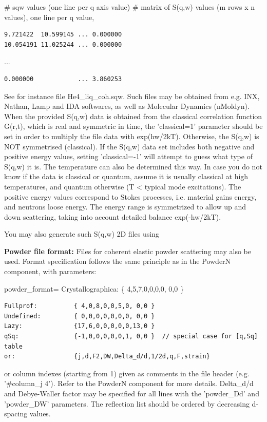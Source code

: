 \# sqw values (one line per q axis value) \# matrix of S(q,w) values (m rows x n values), one line per q value,

\begin{verbatim}
9.721422  10.599145 ... 0.000000
10.054191 11.025244 ... 0.000000
\end{verbatim}

...

\begin{verbatim}
0.000000            ... 3.860253
\end{verbatim}

See for instance file He4\_liq\_coh.sqw. Such files may be obtained from e.g. INX, Nathan, Lamp and IDA softwares, as well as Molecular Dynamics (nMoldyn). When the provided S(q,w) data is obtained from the classical correlation function G(r,t), which is real and symmetric in time, the 'classical=1' parameter should be set in order to multiply the file data with exp(hw/2kT). Otherwise, the S(q,w) is NOT symmetrised (classical). If the S(q,w) data set includes both negative and positive energy values, setting 'classical=-1' will attempt to guess what type of S(q,w) it is. The temperature can also be determined this way. In case you do not know if the data is classical or quantum, assume it is usually classical at high temperatures, and quantum otherwise (T \textless{} typical mode excitations). The positive energy values correspond to Stokes processes, i.e. material gains energy, and neutrons loose energy. The energy range is symmetrized to allow up and down scattering, taking into account detailed balance exp(-hw/2kT).

You may also generate such S(q,w) 2D files using 

\textbf{Powder file format:} Files for coherent elastic powder scattering may also be used. Format specification follows the same principle as in the PowderN component, with parameters:

powder\_format= Crystallographica: \{ 4,5,7,0,0,0,0, 0,0 \}

\begin{verbatim}
Fullprof:          { 4,0,8,0,0,5,0, 0,0 }
Undefined:         { 0,0,0,0,0,0,0, 0,0 }
Lazy:              {17,6,0,0,0,0,0,13,0 }
qSq:               {-1,0,0,0,0,0,1, 0,0 }  // special case for [q,Sq] table
or:                {j,d,F2,DW,Delta_d/d,1/2d,q,F,strain}
\end{verbatim}

or column indexes (starting from 1) given as comments in the file header (e.g. '\#column\_j 4'). Refer to the PowderN component for more details. Delta\_d/d and Debye-Waller factor may be specified for all lines with the 'powder\_Dd' and 'powder\_DW' parameters. The reflection list should be ordered by decreasing d-spacing values.

